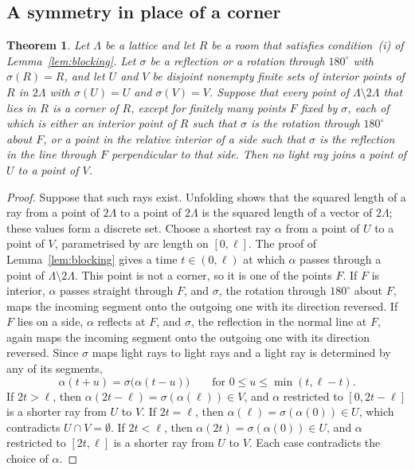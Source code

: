 \documentclass[11pt,a4paper]{article}
\theoremstyle{plain}
\newtheorem{theorem}{Theorem}[section]
\theoremstyle{definition}
\theoremstyle{remark}
\newcommand{\dg}{^\circ}
\numberwithin{equation}{section}
\begin{document}
\subsection{A symmetry in place of a corner}

\begin{theorem}\label{thm:symmetry}
Let $\Lambda$ be a lattice and let $R$ be a room that satisfies condition~\textup{(i)} of Lemma~\textup{\ref{lem:blocking}}. Let $\sigma$ be a reflection or a rotation through $180\dg$ with $\sigma(R)=R$, and let $U$ and $V$ be disjoint nonempty finite sets of interior points of $R$ in $2\Lambda$ with $\sigma(U)=U$ and $\sigma(V)=V$. Suppose that every point of $\Lambda\setminus2\Lambda$ that lies in $R$ is a corner of $R$, except for finitely many points $F$ fixed by $\sigma$, each of which is either an interior point of $R$ such that $\sigma$ is the rotation through $180\dg$ about $F$, or a point in the relative interior of a side such that $\sigma$ is the reflection in the line through $F$ perpendicular to that side. Then no light ray joins a point of $U$ to a point of $V$.
\end{theorem}

\begin{proof}
Suppose that such rays exist. Unfolding shows that the squared length of a ray from a point of $2\Lambda$ to a point of $2\Lambda$ is the squared length of a vector of $2\Lambda$; these values form a discrete set. Choose a shortest ray $\alpha$ from a point of $U$ to a point of $V$, parametrised by arc length on $[0,\ell]$. The proof of Lemma~\ref{lem:blocking} gives a time $t\in(0,\ell)$ at which $\alpha$ passes through a point of $\Lambda\setminus2\Lambda$. This point is not a corner, so it is one of the points $F$. If $F$ is interior, $\alpha$ passes straight through $F$, and $\sigma$, the rotation through $180\dg$ about $F$, maps the incoming segment onto the outgoing one with its direction reversed. If $F$ lies on a side, $\alpha$ reflects at $F$, and $\sigma$, the reflection in the normal line at $F$, again maps the incoming segment onto the outgoing one with its direction reversed. Since $\sigma$ maps light rays to light rays and a light ray is determined by any of its segments,
\[
\alpha(t+u)=\sigma\bigl(\alpha(t-u)\bigr)\qquad\text{for }0\le u\le\min(t,\ell-t).
\]
If $2t>\ell$, then $\alpha(2t-\ell)=\sigma(\alpha(\ell))\in V$, and $\alpha$ restricted to $[0,2t-\ell]$ is a shorter ray from $U$ to $V$. If $2t=\ell$, then $\alpha(\ell)=\sigma(\alpha(0))\in U$, which contradicts $U\cap V=\emptyset$. If $2t<\ell$, then $\alpha(2t)=\sigma(\alpha(0))\in U$, and $\alpha$ restricted to $[2t,\ell]$ is a shorter ray from $U$ to $V$. Each case contradicts the choice of $\alpha$.
\end{proof}
\end{document}
